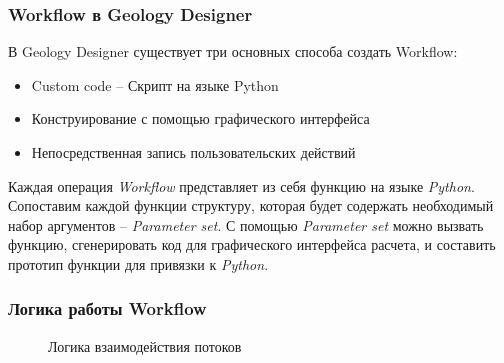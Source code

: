 \documentclass[pdf, 10pt, unicode, aspectratio=169]{beamer} %
\begin{document}
\begin{frame}\frametitle{Workflow в Geology Designer}	
	В Geology Designer существует три основных способа создать Workflow:
	\begin{itemize}
		\item Custom code -- Скрипт на языке Python
		\item Конструирование с помощью графического интерфейса
		\item Непосредственная запись пользовательских действий
	\end{itemize}
	
Каждая операция \emph {Workflow} представляет из себя функцию на языке \emph{Python}.
Сопоставим каждой функции структуру, которая будет содержать необходимый набор аргументов -- \emph{Parameter set}. С помощью \emph{Parameter set} можно вызвать функцию, сгенерировать код для графического интерфейса расчета, и составить прототип функции для привязки к \emph{Python}.
\end{frame}
\begin{frame}\frametitle{Логика работы Workflow}

\begin{figure}[H]	
	\caption{Логика взаимодействия потоков}
	\label{img:tnavwf}
\end{figure}
\end{frame}
\end{document}
